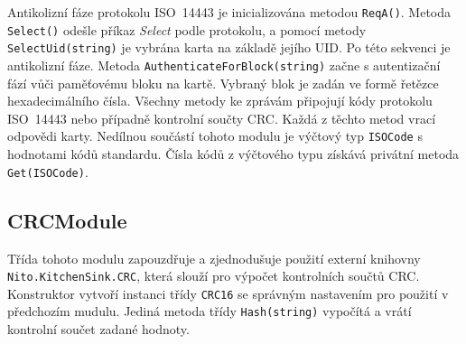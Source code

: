 Antikolizní fáze protokolu ISO~14443 je inicializována metodou \verb|ReqA()|. Metoda \verb|Select()| odešle příkaz \emph{Select} podle protokolu, a pomocí metody \verb|SelectUid(string)| je vybrána karta na základě jejího UID. Po této sekvenci je antikolizní fáze. Metoda \verb|AuthenticateForBlock(string)| začne s autentizační fází vůči paměťovému bloku na kartě. Vybraný blok je zadán ve formě řetězce hexadecimálního čísla. Všechny metody ke zprávám připojují kódy protokolu ISO~14443 nebo případně kontrolní součty CRC. Každá z těchto metod vrací odpovědi karty. Nedílnou součástí tohoto modulu je výčtový typ \verb|ISOCode| s hodnotami kódů standardu. Čísla kódů z výčtového typu získává privátní metoda \verb|Get(ISOCode)|.

\subsection*{CRCModule}
Třída tohoto modulu zapouzdřuje a zjednodušuje použití externí knihovny \verb|Nito.KitchenSink.CRC|, která slouží pro výpočet kontrolních součtů CRC. Konstruktor vytvoří instanci třídy \verb|CRC16| se správným nastavením pro použití v předchozím mudulu. Jediná metoda třídy \verb|Hash(string)| vypočítá a vrátí kontrolní součet zadané hodnoty. 

